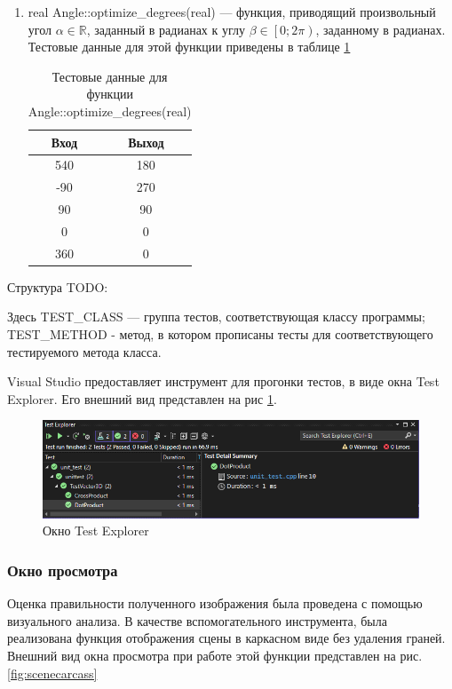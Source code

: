 \begin{enumerate}
	\item real Angle::optimize\_degrees(real) --- функция, приводящий произвольный угол $\alpha\in\mathbb{R}$, заданный в радианах к углу $\beta\in\left[0; 2\pi\right)$, заданному в радианах. Тестовые данные для этой функции приведены в таблице \ref{tbl:optimize_degrees}
	\begin{table}
		\centering
		\caption{Тестовые данные для функции Angle::optimize\_degrees(real)}
		\label{tbl:optimize_degrees}
		\begin{tabular}{|c|c|}
			\hline
			Вход & Выход \\
			\hline
			540 & 180 \\
			-90 & 270 \\
			90 & 90 \\
			0 & 0 \\
			360 & 0 \\
			\hline
		\end{tabular}
	\end{table}
\end{enumerate}

Структура TODO:

Здесь TEST\_CLASS --- группа тестов, соответствующая классу программы; TEST\_METHOD - метод, в котором прописаны тесты для соответствующего тестируемого метода класса.

Visual Studio предоставляет инструмент для прогонки тестов, в виде окна Test Explorer. Его внешний вид представлен на рис \ref{fig:test_explorer}.

\begin{figure}[ht]
	\centering
	\includegraphics[width=1\linewidth]{img/test_explorer}
	\caption{Окно Test Explorer}
	\label{fig:test_explorer}
\end{figure}


\subsubsection{Окно просмотра}
Оценка правильности полученного изображения была проведена с помощью визуального анализа. В качестве вспомогательного инструмента, была реализована функция отображения сцены в каркасном виде без удаления граней. Внешний вид окна просмотра при работе этой функции представлен на рис. \ref{fig:scenecarcass}

